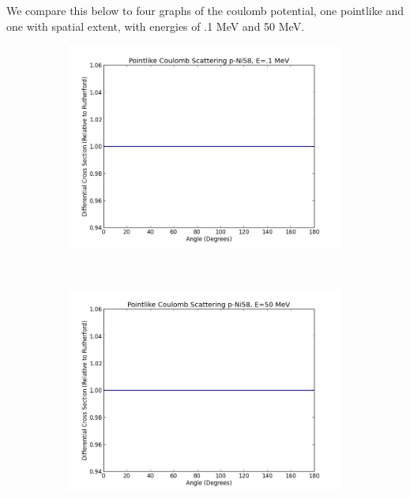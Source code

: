 \documentclass[paper=a4, fontsize=11pt]{scrartcl} %
\numberwithin{equation}{section} %
\numberwithin{figure}{section} %
\numberwithin{table}{section} %
\begin{document}
We compare this below to four graphs of the coulomb potential, one pointlike and one with spatial extent, with energies of .1 MeV and 50 MeV.\\

 \begin{figure}[hbt]
        \centering
        \begin{subfigure}[b!]{0.45\textwidth}
                \includegraphics[width=\textwidth]{PointlikeEpoint1.png}
        \end{subfigure}%
        ~ %
\quad
        \begin{subfigure}[b!]{0.45\textwidth}
                \includegraphics[width=\textwidth]{PointlikeE50.png}

\end{subfigure}
\end{figure}
\end{document}
